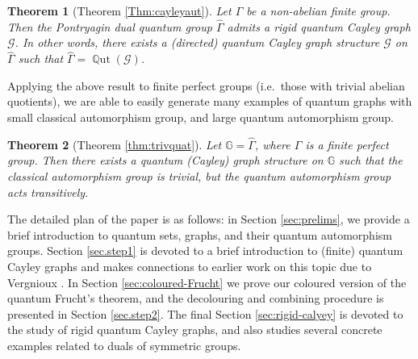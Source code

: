 \documentclass[12pt]{amsart}
\newtheorem{thmx}{Theorem}
\theoremstyle{definition}
\theoremstyle{definition}
\theoremstyle{definition}
\theoremstyle{definition}
\DeclareMathOperator{\Aut}{Aut}
\DeclareMathOperator{\Qut}{\mathbb{Q}ut}
\newcommand{\G}{\mathbb{G}}
\newcommand{\Gr}{\mathcal{G}}
\newcommand{\Cst}{\textrm{C}^\ast}
\numberwithin{equation}{section}
\begin{document}
 \begin{thmx}[Theorem \ref{Thm:cayleyaut}]
Let $\Gamma$ be a non-abelian finite group.  Then the Pontryagin dual quantum group $\widehat \Gamma$ admits a rigid quantum Cayley graph $\Gr$. 
In other words, there exists a (directed) quantum Cayley graph structure $\Gr$ on $\widehat \Gamma$ such that $\widehat \Gamma = \Qut(\Gr)$. 
 \end{thmx}

Applying the above result to finite perfect groups (i.e.\ those with trivial abelian quotients), we are able to easily generate many examples of quantum graphs with small classical automorphism group, and large quantum automorphism group.

 \begin{thmx}[Theorem \ref{thm:trivquat}]
 Let $\G= \widehat{\Gamma}$, where $\Gamma$ is a finite perfect group. Then there exists a quantum (Cayley) graph structure on $\G$ such that the classical automorphism group is trivial, but the quantum automorphism group acts transitively.
 \end{thmx}

The detailed plan of the paper is as follows: in Section \ref{sec:prelims}, we provide a brief introduction to quantum sets, graphs, and their quantum automorphism groups. Section \ref{sec.step1} is devoted to a brief introduction to (finite) quantum Cayley graphs and makes connections to earlier work on this topic due to Vergnioux \cite{Ver05}.  In Section \ref{sec:coloured-Frucht} we prove our coloured version of the quantum Frucht's theorem, and the decolouring and combining procedure is presented in Section \ref{sec.step2}.  The final Section \ref{sec:rigid-calyey} is devoted to the study of rigid quantum Cayley graphs, and also studies several concrete examples related to duals of symmetric groups.   
    
%
\end{document}
